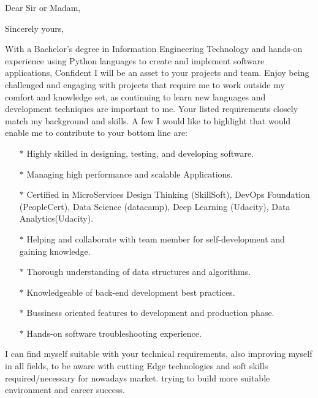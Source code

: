 \documentclass{subfiles}
\begin{document}
\clearpage
{} %
\date{\today} %
\opening{Dear Sir or Madam,} %
\closing{Sincerely yours,} %

\makelettertitle %
With a Bachelor’s degree in Information Engineering Technology and hands-on experience using Python languages to create and implement software applications, Confident I will be an asset to your projects and team.
\newline
Enjoy being challenged and engaging with projects that require me to work outside my comfort and knowledge set, as continuing to learn new languages and development techniques are important to me.
\newline
Your listed requirements closely match my background and skills. A few I would like to highlight that would enable me to contribute to your bottom line are:

\begin{itemize}
        \item[$\ast$] Highly skilled in designing, testing, and developing software.
        \item[$\ast$] Managing high performance and scalable Applications.
	\item[$\ast$] Certified in MicroServices Design Thinking (SkillSoft), DevOps Foundation (PeopleCert), Data Science (datacamp), 
                        Deep Learning (Udacity), Data Analytics(Udacity).
        \item[$\ast$] Helping and collaborate with team member for self-development and gaining knowledge.
        \item[$\ast$] Thorough understanding of data structures and algorithms.
        \item[$\ast$] Knowledgeable of back-end development best practices.
        \item[$\ast$] Bussiness oriented features to development and production phase.
        \item[$\ast$] Hands-on software troubleshooting experience.
\end{itemize}

I can find myself suitable with your technical requirements, also improving myself in all fields, 
to be aware with cutting Edge technologies and soft skills required/necessary for nowadays market. 
trying to build more suitable environment and career success.
\end{document}
